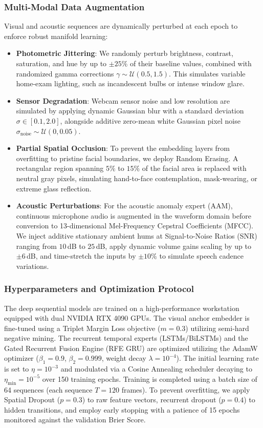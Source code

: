 \documentclass[journal]{IEEEtran}
\begin{document}
\subsubsection{Multi-Modal Data Augmentation}
Visual and acoustic sequences are dynamically perturbed at each epoch to enforce robust manifold learning:
\begin{itemize}
    \item \textbf{Photometric Jittering}: We randomly perturb brightness, contrast, saturation, and hue by up to $\pm 25\%$ of their baseline values, combined with randomized gamma corrections $\gamma \sim \mathcal{U}(0.5, 1.5)$. This simulates variable home-exam lighting, such as incandescent bulbs or intense window glare.
    \item \textbf{Sensor Degradation}: Webcam sensor noise and low resolution are simulated by applying dynamic Gaussian blur with a standard deviation $\sigma \in [0.1, 2.0]$, alongside additive zero-mean white Gaussian pixel noise $\sigma_{\mathrm{noise}} \sim \mathcal{U}(0, 0.05)$.
    \item \textbf{Partial Spatial Occlusion}: To prevent the embedding layers from overfitting to pristine facial boundaries, we deploy Random Erasing. A rectangular region spanning $5\%$ to $15\%$ of the facial area is replaced with neutral gray pixels, simulating hand-to-face contemplation, mask-wearing, or extreme glass reflection.
    \item \textbf{Acoustic Perturbations}: For the acoustic anomaly expert (AAM), continuous microphone audio is augmented in the waveform domain before conversion to 13-dimensional Mel-Frequency Cepstral Coefficients (MFCC). We inject additive stationary ambient hums at Signal-to-Noise Ratios (SNR) ranging from $10\,$dB to $25\,$dB, apply dynamic volume gains scaling by up to $\pm 6\,$dB, and time-stretch the inputs by $\pm 10\%$ to simulate speech cadence variations.
\end{itemize}

\subsubsection{Hyperparameters and Optimization Protocol}
The deep sequential models are trained on a high-performance workstation equipped with dual NVIDIA RTX 4090 GPUs. The visual anchor embedder is fine-tuned using a Triplet Margin Loss objective ($m=0.3$) utilizing semi-hard negative mining. The recurrent temporal experts (LSTMs/BiLSTMs) and the Gated Recurrent Fusion Engine (RFE GRU) are optimized utilizing the AdamW optimizer ($\beta_1=0.9$, $\beta_2=0.999$, weight decay $\lambda=10^{-4}$). The initial learning rate is set to $\eta = 10^{-3}$ and modulated via a Cosine Annealing scheduler decaying to $\eta_{\mathrm{min}} = 10^{-5}$ over 150 training epochs. Training is completed using a batch size of 64 sequences (each sequence $T=120$ frames). To prevent overfitting, we apply Spatial Dropout ($p=0.3$) to raw feature vectors, recurrent dropout ($p=0.4$) to hidden transitions, and employ early stopping with a patience of 15 epochs monitored against the validation Brier Score.
\end{document}
